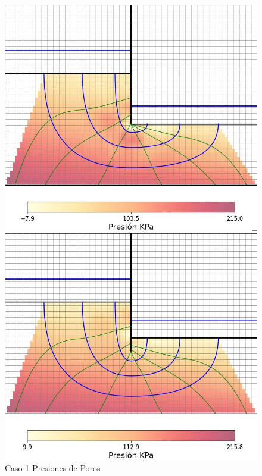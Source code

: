 \documentclass{article}
\begin{document}
\begin{figure}[H]
  \centering
  \begin{minipage}{0.32\textwidth}
      \centering
      \includegraphics[width=\textwidth]{FOTOS/caso_1_mapa_calor.jpg}
      \caption{Caso 1 Presiones de Poros}
  \end{minipage}
  \begin{minipage}{0.32\textwidth}
      \centering
      \includegraphics[width=\textwidth]{FOTOS/caso_2_mapa_calor.jpg}

\end{minipage}
\end{figure}
\end{document}
